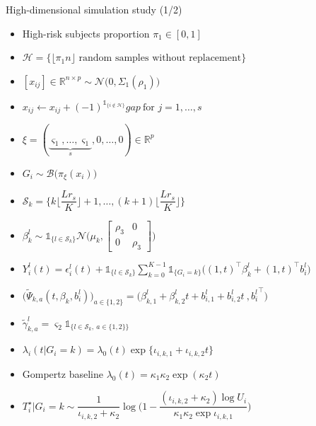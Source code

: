 \documentclass{beamer}
\newcommand{\R}{\mathbb R}
\newcommand{\cB}{\mathcal B}
\newcommand{\cH}{\mathcal H}
\newcommand{\cS}{\mathcal S}
\newcommand{\cN}{\mathcal N}
\newcommand{\bSigma}{\textbf{$\Sigma$}}
\newcommand{\ind}[1]{\mathds{1}_{#1}}
\begin{document}
\begin{frame}{High-dimensional simulation study (1/2)}

\begin{itemize}
 \small
 \item<1-> High-risk subjects proportion $\pi_1 \in [0,1]$
 \item<2-> $\cH = \big\{\lfloor \pi_1 n \rfloor \text{ random samples without replacement} \big\}$
 \item<3-> $[x_{ij}] \in \R^{n \times p} \sim \cN \big(0, \bSigma_1(\rho_1)\big)$
 \item<4-> $x_{ij} \leftarrow x_{ij} + (-1)^{\ind{\{i \notin \cH\}}} gap\ \text{for } j = 1, \dots, s$
 \item<5-> $\xi = (\underbrace{\varsigma_1,\ldots,\varsigma_1}_s,0,\ldots,0) \in \R^p$
 \item<6-> $G_i \sim \cB\big(\pi_\xi(x_i)\big)$
 \item<7-> $\cS_k=\Big\{ k \big\lfloor \dfrac{L r_s}{K} \big\rfloor + 1, \ldots,  (k + 1) \big\lfloor \dfrac{L r_s}{K} \big\rfloor \Big\}$
 \item<8-> $\beta_k^l \sim \ind{\{l \in \cS_k \}} \cN\Big( 
\mu_k, 
\begin{bmatrix}
  \rho_3 & 0\\
  0 & \rho_3
\end{bmatrix} 
\Big)$
 \item<9-> $Y_i^l(t) = \epsilon_i^l(t) + \ind{\{l \in \cS_k \}}\sum_{k=0}^{K-1} \ind{\{G_i=k\}} \big( (1, t)^\top \beta_k^l + (1, t)^\top b_i^l \big)$
 \item<10-> $\big(\tilde \Psi_{k,a}(t, \beta_k, b_i^l)\big)_{a \in \{1,2\}} = \big(\beta_{k,1}^l + \beta_{k,2}^l t + b_{i,1}^l + b_{i,2}^l t\ , {b_i^l}^\top \big)$
 \item<11-> $\tilde \gamma_{k,a}^l = \varsigma_2 \ind{\{l \in \cS_k,\ a\in \{1, 2\} \}}$
 \item<12-> $\lambda_i(t|G_i = k) = \lambda_0(t) \exp \big\{ \iota_{i,k,1} + \iota_{i,k,2} t \big\}$
 \item<13-> Gompertz baseline $\lambda_0(t) = \kappa_1 \kappa_2 \exp(\kappa_2t)$
 \item<14-> $T_i^\star | G_i=k \sim \dfrac{1}{\iota_{i,k,2} + \kappa_2} \log \Big(1 - \dfrac{(\iota_{i,k,2} + \kappa_2) \log U_i}{\kappa_1 \kappa_2 \exp\iota_{i,k,1}} \Big)$
\end{itemize}

\end{frame}
\end{document}
